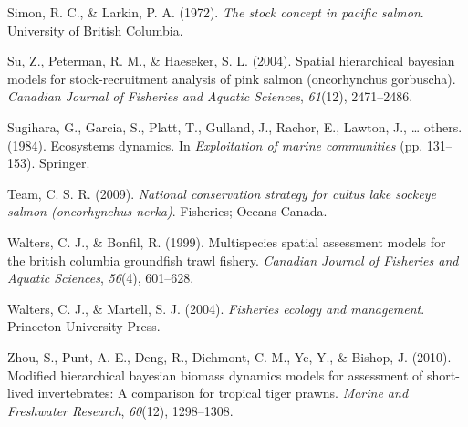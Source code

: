 \documentclass[12pt,]{scrartcl}
\begin{document}
\hypertarget{ref-simon1972stock}{}
Simon, R. C., \& Larkin, P. A. (1972). \emph{The stock concept in
pacific salmon}. University of British Columbia.

\hypertarget{ref-su2004spatial}{}
Su, Z., Peterman, R. M., \& Haeseker, S. L. (2004). Spatial hierarchical
bayesian models for stock-recruitment analysis of pink salmon
(oncorhynchus gorbuscha). \emph{Canadian Journal of Fisheries and
Aquatic Sciences}, \emph{61}(12), 2471--2486.

\hypertarget{ref-sugihara1984ecosystems}{}
Sugihara, G., Garcia, S., Platt, T., Gulland, J., Rachor, E., Lawton,
J., \ldots{} others. (1984). Ecosystems dynamics. In \emph{Exploitation
of marine communities} (pp. 131--153). Springer.

\hypertarget{ref-team2009national}{}
Team, C. S. R. (2009). \emph{National conservation strategy for cultus
lake sockeye salmon (oncorhynchus nerka)}. Fisheries; Oceans Canada.

\hypertarget{ref-walters1999multispecies}{}
Walters, C. J., \& Bonfil, R. (1999). Multispecies spatial assessment
models for the british columbia groundfish trawl fishery. \emph{Canadian
Journal of Fisheries and Aquatic Sciences}, \emph{56}(4), 601--628.

\hypertarget{ref-walters2004fisheries}{}
Walters, C. J., \& Martell, S. J. (2004). \emph{Fisheries ecology and
management}. Princeton University Press.

\hypertarget{ref-zhou2010modified}{}
Zhou, S., Punt, A. E., Deng, R., Dichmont, C. M., Ye, Y., \& Bishop, J.
(2010). Modified hierarchical bayesian biomass dynamics models for
assessment of short-lived invertebrates: A comparison for tropical tiger
prawns. \emph{Marine and Freshwater Research}, \emph{60}(12),
1298--1308.
\end{document}
